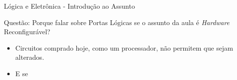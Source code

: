 	\begin{frame}{Lógica e Eletrônica - Introdução ao Assunto}
		\begin{block}{Questão: Porque falar sobre Portas Lógicas se o assunto da aula é \textit{Hardware} Reconfigurável?}
			\begin{itemize}
				\item Circuitos comprado hoje, como um processador, não permitem que sejam alterados.

				\item E se
			\end{itemize}
		\end{block}
	\end{frame}
